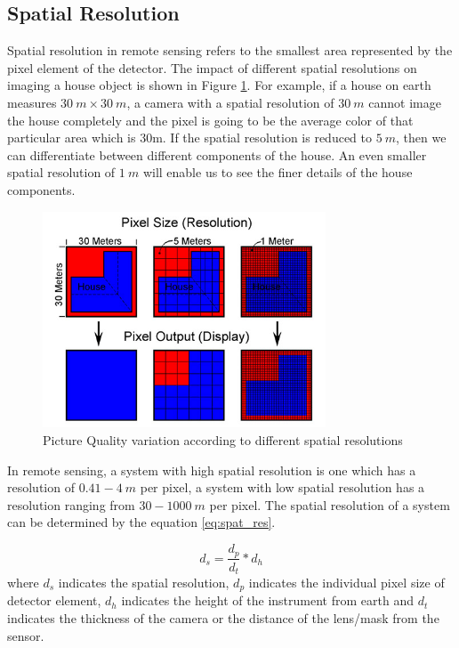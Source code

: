 \subsection{Spatial Resolution}
Spatial resolution in remote sensing refers to the smallest area represented by the pixel element of the detector. The impact of different spatial resolutions on imaging a house object is shown in Figure \ref{fig:spatial_resolution}. For example, if a house on earth measures $30 \ m \times 30 \ m$, a camera with a spatial resolution of $30 \  m$ cannot image the house completely and the pixel is going to be the average color of that particular area which is 30m. If the spatial resolution is reduced to $5 \ m$, then we can differentiate between different components of the house. An even smaller spatial resolution of $1 \ m$ will enable us to see the finer details of the house components. 

\begin{figure}[htb]
\centering
\includegraphics[width=0.75\textwidth]{pics/spatial-resolution}
\caption{Picture Quality variation according to different spatial resolutions\cite{SpatialResol}}
\label{fig:spatial_resolution}
\end{figure}

In remote sensing, a system with high spatial resolution is one which has a resolution of $0.41-4 \  m$ per pixel, a system with low spatial resolution has a resolution ranging from $30-1000 \ m$ per pixel\cite{SpatialResol}. The spatial resolution of a system can be determined by the equation \ref{eq:spat_res}. 

\begin{equation}
\label{eq:spat_res}
d_s = \frac{d_p}{d_t} * d_h
\end{equation}
where $d_s$ indicates the spatial resolution, $d_p$ indicates the individual pixel size of detector element, $d_h$ indicates the height of the instrument from earth and $d_t$ indicates the thickness of the camera or the distance of the lens/mask from the sensor.


